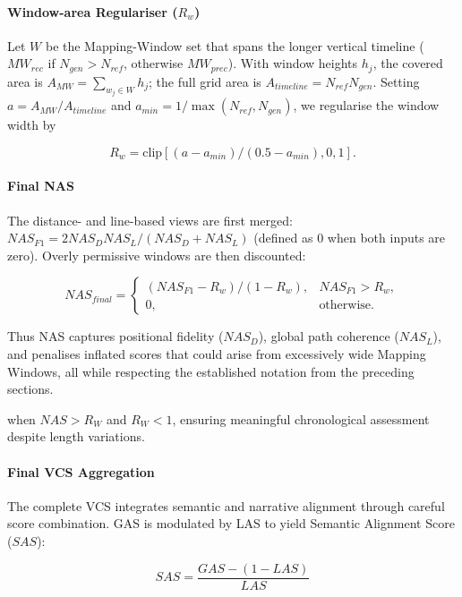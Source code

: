 \documentclass[letterpaper]{article} %
\begin{document}
\paragraph{Window-area Regulariser ($R_w$)}
Let $W$ be the Mapping-Window set that spans the longer vertical timeline ($MW_{rec}$ if $N_{gen} > N_{ref}$, otherwise $MW_{prec}$). With window heights $h_j$, the covered area is $A_{MW} = \sum_{w_j \in W} h_j$; the full grid area is $A_{timeline} = N_{ref} N_{gen}$. Setting $a = A_{MW}/A_{timeline}$ and $a_{min} = 1/\max(N_{ref}, N_{gen})$, we regularise the window width by

\begin{equation}
R_w = \text{clip}[(a - a_{min})/(0.5 - a_{min}), 0, 1].
\end{equation}

\paragraph{Final NAS}
The distance- and line-based views are first merged: $NAS_{F1} = 2 NAS_D NAS_L/(NAS_D + NAS_L)$ (defined as 0 when both inputs are zero). Overly permissive windows are then discounted:

\begin{equation}
NAS_{final} = \begin{cases}
(NAS_{F1} - R_w)/(1 - R_w), & NAS_{F1} > R_w, \\
0, & \text{otherwise}.
\end{cases}
\end{equation}

Thus NAS captures positional fidelity ($NAS_D$), global path coherence ($NAS_L$), and penalises inflated scores that could arise from excessively wide Mapping Windows, all while respecting the established notation from the preceding sections.


when $NAS > R_W$ and $R_W < 1$, ensuring meaningful chronological assessment despite length variations.

\paragraph{Final VCS Aggregation}
The complete VCS integrates semantic and narrative alignment through careful score combination. GAS is modulated by LAS to yield Semantic Alignment Score ($SAS$):

\begin{equation} \label{eq:sas_revised} 
SAS = \frac{GAS - (1 - LAS)}{LAS}
\end{equation}
\end{document}
